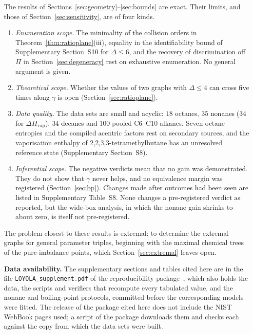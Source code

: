 \documentclass[a5paper, 10pt]{article}
\theoremstyle{plain}
\theoremstyle{remark}
\theoremstyle{definition}
\begin{document}
The results of Sections~\ref{sec:geometry}--\ref{sec:bounds} are exact.
Their limits, and those of Section~\ref{sec:sensitivity}, are of four
kinds.
\begin{enumerate}
\item[(i)] \emph{Enumeration scope.} The minimality of the collision orders in
Theorem~\ref{thm:ratioplane}(iii), equality in the identifiability
bound of Supplementary Section~S10 for $\Delta \le 6$, and the
recovery of discrimination off $\Pi$ in Section~\ref{sec:degeneracy}
rest on exhaustive enumeration. No general argument is given.
\item[(ii)] \emph{Theoretical scope.} Whether the values of two graphs with $\Delta \le 4$ can cross
five times along $\gamma$ is open (Section~\ref{sec:ratioplane}).
\item[(iii)] \emph{Data quality.} The data sets are small and acyclic: $18$ octanes, $35$
nonanes ($34$ for $\Delta H_{\mathrm{vap}}$), $34$ decanes and $100$ pooled C6--C10 alkanes. Seven octane
entropies and the compiled acentric factors rest on secondary sources,
and the vaporisation enthalpy of 2,2,3,3-tetramethylbutane has an
unresolved reference state (Supplementary Section~S8).
\item[(iv)] \emph{Inferential scope.} The negative verdicts mean that no
gain was demonstrated. They do not show that $\gamma$ never helps, and
no equivalence margin was registered (Section~\ref{sec:bp}). Changes made after outcomes had been seen are listed in
Supplementary Table~S8. None changes a pre-registered verdict as
reported, but the wide-box analysis, in which the nonane gain shrinks
to about zero, is itself not pre-registered.
\end{enumerate}

The problem closest to these results is extremal: to determine the
extremal graphs for general parameter triples, beginning with the
maximal chemical trees of the pure-imbalance points, which
Section~\ref{sec:extremal} leaves open.

\medskip
\noindent\textbf{Data availability.} The supplementary sections and
tables cited here are in the file \texttt{LOYOLA\_supplement.pdf} of the
reproducibility package~\cite{LoyolaRepo}, which also holds the data, the
scripts and verifiers that recompute every tabulated value, and the
nonane and boiling-point protocols, committed before the corresponding
models were fitted. The release of the package cited here does not include the NIST
WebBook pages used; a script of the package downloads them and checks each against the copy
from which the data sets were built.
\end{document}
